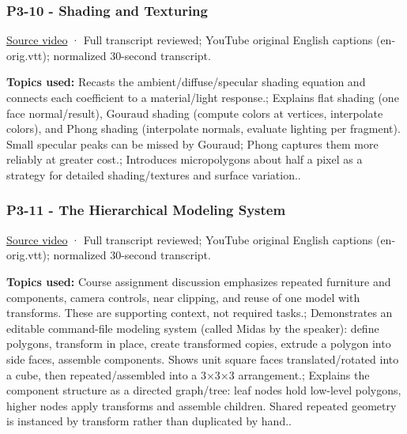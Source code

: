 \subsubsection{P3-10 - Shading and Texturing}\label{04-visual-computing-ii-ch036-p3-10---shading-and-texturing}

\hypertarget{04-visual-computing-ii-ch036-p3-10---shading-and-texturing}{}

\href{https://www.youtube.com/watch?v=Is6D5rnWEvs}{Source video} · Full transcript reviewed; YouTube original English captions (en-orig.vtt); normalized 30-second transcript.

\textbf{Topics used:} Recasts the ambient/diffuse/specular shading equation and connects each coefficient to a material/light response.; Explains flat shading (one face normal/result), Gouraud shading (compute colors at vertices, interpolate colors), and Phong shading (interpolate normals, evaluate lighting per fragment). Small specular peaks can be missed by Gouraud; Phong captures them more reliably at greater cost.; Introduces micropolygons about half a pixel as a strategy for detailed shading/textures and surface variation..

\subsubsection{P3-11 - The Hierarchical Modeling System}\label{04-visual-computing-ii-ch036-p3-11---the-hierarchical-modeling-system}

\hypertarget{04-visual-computing-ii-ch036-p3-11---the-hierarchical-modeling-system}{}

\href{https://www.youtube.com/watch?v=D8ZYHXom0qk}{Source video} · Full transcript reviewed; YouTube original English captions (en-orig.vtt); normalized 30-second transcript.

\textbf{Topics used:} Course assignment discussion emphasizes repeated furniture and components, camera controls, near clipping, and reuse of one model with transforms. These are supporting context, not required tasks.; Demonstrates an editable command-file modeling system (called Midas by the speaker): define polygons, transform in place, create transformed copies, extrude a polygon into side faces, assemble components. Shows unit square faces translated/rotated into a cube, then repeated/assembled into a 3×3×3 arrangement.; Explains the component structure as a directed graph/tree: leaf nodes hold low-level polygons, higher nodes apply transforms and assemble children. Shared repeated geometry is instanced by transform rather than duplicated by hand..

